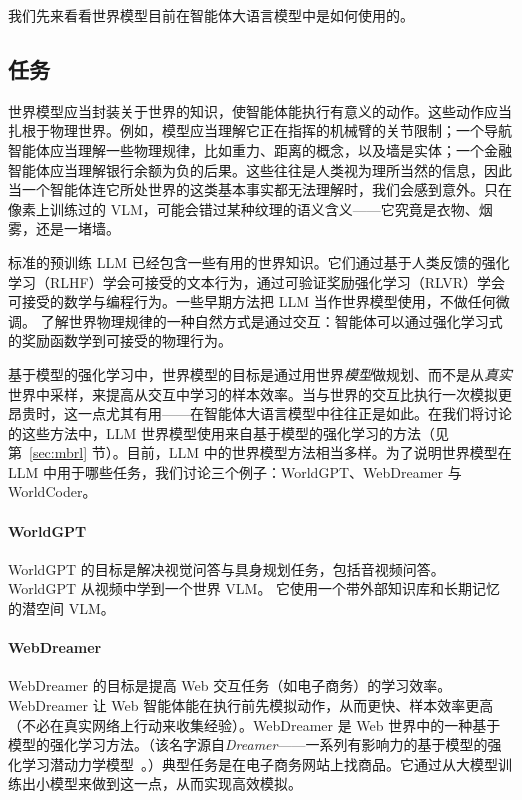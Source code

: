 我们先来看看世界模型目前在智能体大语言模型中是如何使用的。

\subsection{任务}
世界模型应当封装关于世界的知识，使智能体能执行有意义的动作。这些动作应当扎根于物理世界。例如，模型应当理解它正在指挥的机械臂的关节限制；一个导航智能体应当理解一些物理规律，比如重力、距离的概念，以及墙是实体；一个金融智能体应当理解银行余额为负的后果。这些往往是人类视为理所当然的信息，因此当一个智能体连它所处世界的这类基本事实都无法理解时，我们会感到意外。只在像素上训练过的 VLM，可能会错过某种纹理的语义含义——它究竟是衣物、烟雾，还是一堵墙。

标准的预训练 LLM 已经包含一些有用的世界知识。它们通过基于人类反馈的强化学习（RLHF）学会可接受的文本行为，通过可验证奖励强化学习（RLVR）学会可接受的数学与编程行为。一些早期方法把 LLM 当作世界模型使用，不做任何微调。
了解世界物理规律的一种自然方式是通过交互：智能体可以通过强化学习式的奖励函数学到可接受的物理行为。


基于模型的强化学习中，世界模型的目标是通过用世界{\em 模型}做规划、而不是从{\em 真实}世界中采样，来提高从交互中学习的样本效率。当与世界的交互比执行一次模拟更昂贵时，这一点尤其有用——在智能体大语言模型中往往正是如此。在我们将讨论的这些方法中，LLM 世界模型使用来自基于模型的强化学习的方法（见第~\ref{sec:mbrl} 节）。目前，LLM 中的世界模型方法相当多样。为了说明世界模型在 LLM 中用于哪些任务，我们讨论三个例子：WorldGPT、WebDreamer 与 WorldCoder。

\paragraph{WorldGPT}
WorldGPT \citep{ge2024worldgpt} 的目标是解决视觉问答与具身规划任务，包括音视频问答。WorldGPT 从视频中学到一个世界 VLM。
它使用一个带外部知识库和长期记忆的潜空间 VLM。

\paragraph{WebDreamer}
WebDreamer \citep{gu2024your} 的目标是提高 Web 交互任务（如电子商务）的学习效率。WebDreamer 让 Web 智能体能在执行前先模拟动作，从而更快、样本效率更高（不必在真实网络上行动来收集经验）。WebDreamer 是 Web 世界中的一种基于模型的强化学习方法。（该名字源自{\em Dreamer}——一系列有影响力的基于模型的强化学习潜动力学模型~\citep{hafner2018learning,hafner2019dream,hafner2023mastering}。）典型任务是在电子商务网站上找商品。它通过从大模型训练出小模型来做到这一点，从而实现高效模拟。

